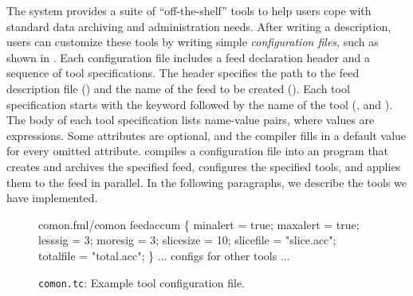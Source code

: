 The \padsd{} system provides a suite of ``off-the-shelf'' tools to
help users cope with standard data archiving and
administration needs.  After writing
a \padsd{} description, users can customize these tools by
writing simple {\em configuration files}, such as shown in
.   
Each configuration file includes a feed declaration header 
and a sequence of tool specifications. The header specifies the path to the 
feed description file () and the name of the feed to be created ().
Each tool specification starts with the keyword  followed by the
name of the tool (\eg{},  and ). The body of each tool specification 
lists name-value pairs, where values are \ocaml{} expressions. Some attributes are 
optional, and the compiler fills in a default value for every omitted attribute.
\padsd{} compiles a configuration file into an \ocaml{} program that creates and archives the specified 
feed, configures the specified tools, and applies them to the feed in parallel.
In the following paragraphs, we describe the tools we have implemented.

\begin{figure}[t]
\centering
\begin{codebox}
 comon.fml/comon
 feedaccum \{
  minalert  = true;
  maxalert  = true;
  lesssig   = 3;
  moresig   = 3;
  slicesize = 10;
  slicefile = "slice.acc";
  totalfile = "total.acc";
\}
... configs for other tools ...
\end{codebox}
\caption{\texttt{comon.tc}: Example tool configuration file.}
\label{fig:toolconfigs}
\end{figure}






 

